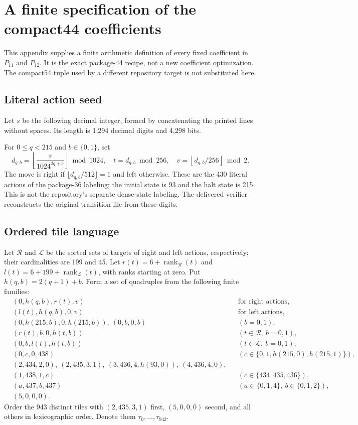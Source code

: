 \documentclass[11pt]{article}
\theoremstyle{definition}
\theoremstyle{remark}
\begin{document}
\appendix
\section{A finite specification of the compact44 coefficients}\label{sec:coefficients}

This appendix supplies a finite arithmetic definition of every fixed
coefficient in $P_{11}$ and $P_{12}$. It is the exact package-44 recipe,
not a new coefficient optimization. The compact54 tuple used by a different
repository target is not substituted here.

\subsection{Literal action seed}

Let $s$ be the following decimal integer, formed by concatenating the printed
lines without spaces. Its length is 1,294 decimal digits and 4,298 bits.

For $0\le q<215$ and $b\in\{0,1\}$, set
\[
 d_{q,b}=\left\lfloor\frac{s}{1024^{2q+b}}\right\rfloor\bmod1024,
 \quad t=d_{q,b}\bmod256,
 \quad v=\left\lfloor d_{q,b}/256\right\rfloor\bmod2.
\]
The move is right if $\lfloor d_{q,b}/512\rfloor=1$ and left otherwise.
These are the 430 literal actions of the package-36 labeling; the initial
state is 93 and the halt state is 215. This is not the repository's separate
dense-state labeling. The delivered verifier reconstructs the original
transition file from these digits.

\subsection{Ordered tile language}

Let $\mathcal R$ and $\mathcal L$ be the sorted sets of targets of right and
left actions, respectively; their cardinalities are 199 and 45. Let
$r(t)=6+\operatorname{rank}_{\mathcal R}(t)$ and
$l(t)=6+199+\operatorname{rank}_{\mathcal L}(t)$, with ranks starting at
zero. Put $h(q,b)=2(q+1)+b$. Form a set of quadruples from the following
finite families:
\begin{align*}
 &(0,h(q,b),r(t),v) &&\text{for right actions},\\
 &(l(t),h(q,b),0,v) &&\text{for left actions},\\
 &(0,h(215,b),0,h(215,b)),\ (0,b,0,b) &&(b=0,1),\\
 &(r(t),b,0,h(t,b)) &&(t\in\mathcal R,\ b=0,1),\\
 &(0,b,l(t),h(t,b)) &&(t\in\mathcal L,\ b=0,1),\\
 &(0,c,0,438) &&(c\in\{0,1,h(215,0),h(215,1)\}),\\
 &(2,434,2,0),\ (2,435,3,1),\ (3,436,4,h(93,0)),\ (4,436,4,0),\\
 &(1,438,1,c) &&(c\in\{434,435,436\}),\\
 &(a,437,b,437) &&(a\in\{0,1,4\},\ b\in\{0,1,2\}),\\
 &(5,0,0,0).&&
\end{align*}
Order the 943 distinct tiles with $(2,435,3,1)$ first, $(5,0,0,0)$ second,
and all others in lexicographic order. Denote them $\tau_0,\ldots,\tau_{942}$.
\end{document}

